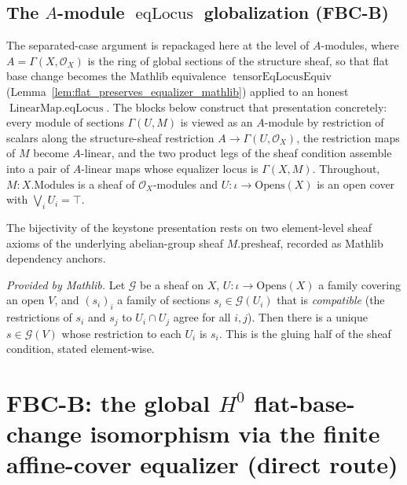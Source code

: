 \subsection{The \texorpdfstring{$A$}{A}-module \texorpdfstring{$\operatorname{eqLocus}$}{eqLocus} globalization (FBC-B)}

The separated-case argument is repackaged here at the level of \(A\)-modules, where
\(A = \Gamma(X,\mathcal{O}_X)\) is the ring of global sections of the structure sheaf, so that flat
base change becomes the Mathlib equivalence \(\operatorname{tensorEqLocusEquiv}\)
(Lemma~\ref{lem:flat_preserves_equalizer_mathlib}) applied to an honest
\(\operatorname{LinearMap.eqLocus}\). The blocks below construct that presentation concretely: every
module of sections \(\Gamma(U, M)\) is viewed as an \(A\)-module by restriction of scalars along the
structure-sheaf restriction \(A \to \Gamma(U,\mathcal{O}_X)\), the restriction maps of \(M\) become
\(A\)-linear, and the two product legs of the sheaf condition assemble into a pair of \(A\)-linear maps
whose equalizer locus is \(\Gamma(X, M)\). Throughout, \(M : X.\mathrm{Modules}\) is a sheaf of
\(\mathcal{O}_X\)-modules and \(U : \iota \to \mathrm{Opens}(X)\) is an open cover with
\(\bigvee_i U_i = \top\).

The bijectivity of the keystone presentation rests on two element-level sheaf axioms of the underlying
abelian-group sheaf \(M.\mathrm{presheaf}\), recorded as Mathlib dependency anchors.


\begin{lemma}
  \label{lem:sheaf_existsUnique_gluing_mathlib}
  \mathlibok
  \textit{Provided by Mathlib.}
  Let \(\mathcal{G}\) be a sheaf on \(X\), \(U : \iota \to \mathrm{Opens}(X)\) a family covering an open
  \(V\), and \((s_i)_i\) a family of sections \(s_i \in \mathcal{G}(U_i)\) that is \emph{compatible}
  (the restrictions of \(s_i\) and \(s_j\) to \(U_i \cap U_j\) agree for all \(i, j\)). Then there is a
  unique \(s \in \mathcal{G}(V)\) whose restriction to each \(U_i\) is \(s_i\). This is the gluing half
  of the sheaf condition, stated element-wise.
\end{lemma}


\section{FBC-B: the global \texorpdfstring{$H^0$}{H0} flat-base-change isomorphism via the finite affine-cover equalizer (direct route)}

